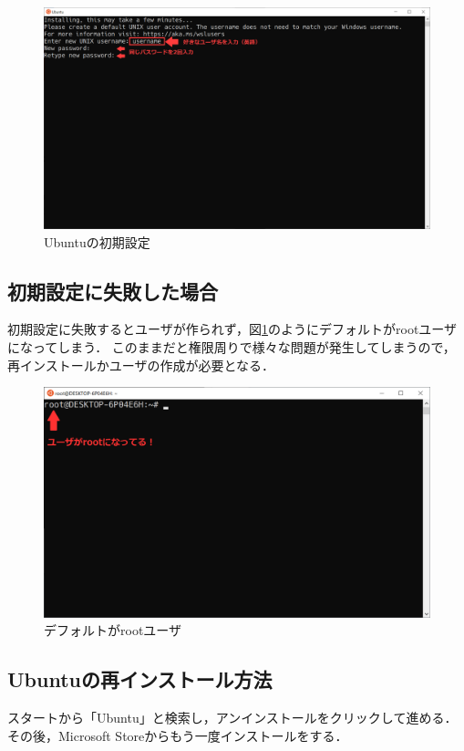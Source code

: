 \documentclass[uplatex]{jsarticle}
\begin{document}
\begin{figure}[h]
\centering
\includegraphics[scale=0.4]{./図/start_ubuntu.png}
\caption{Ubuntuの初期設定}
\end{figure}

\newpage
\subsection{初期設定に失敗した場合}
初期設定に失敗するとユーザが作られず，図\ref{fig:root}のようにデフォルトがrootユーザになってしまう．
このままだと権限周りで様々な問題が発生してしまうので，再インストールかユーザの作成が必要となる．

\begin{figure}[h]
\centering
\includegraphics[scale=0.45]{./図/root.png}
\caption{デフォルトがrootユーザ}
\label{fig:root}
\end{figure}

\subsection{Ubuntuの再インストール方法}
スタートから「Ubuntu」と検索し，アンインストールをクリックして進める．
その後，Microsoft Storeからもう一度インストールをする．
\end{document}
